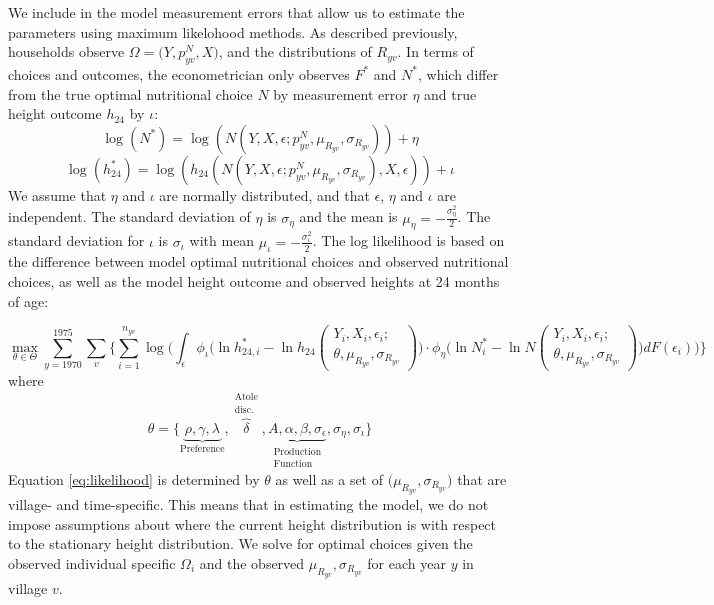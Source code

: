 \label{subsec:estitwo}

We include in the model  measurement errors that allow us to estimate the parameters using maximum likelohood methods.
As described previously, households observe $\Omega = \big(Y, p^{N}_{yv}, X\big)$, and the distributions of $R_{yv}$. In terms of choices and outcomes, the econometrician only observes $F^{*}$ and $N^{*}$, which differ from the true optimal nutritional choice $N$ by measurement error $\eta$ and true height outcome $h_{24}$ by $\iota$:
\begin{equation}
\log(N^{*}) = \log(N(Y, X, \epsilon; p^{N}_{yv},\mu_{R_{yv}},\sigma_{R_{yv}})) + \eta
\end{equation}
\begin{equation}
\log(h_{24}^{*}) = \log(h_{24}(N(Y, X, \epsilon; p^{N}_{yv},\mu_{R_{yv}},\sigma_{R_{yv}}), X, \epsilon)) + \iota
\end{equation}
We assume that $\eta$ and $\iota$ are normally distributed, and that $\epsilon$, $\eta$ and $\iota$ are independent. The standard deviation of $\eta$ is $\sigma_{\eta}$ and the mean is $\mu_{\eta}=-\frac{\sigma_{\eta}^2}{2}$. The standard deviation for $\iota$ is $\sigma_{\iota}$ with mean $\mu_{\iota}=-\frac{\sigma_{\iota}^2}{2}$. The log likelihood is based on the difference between model optimal nutritional choices and observed nutritional choices, as well as the model height outcome and observed heights at 24 months of age:

\begin{equation}
\label{eq:likelihood}
\max_{\theta\in\Theta} \sum_{y=1970}^{1975}\sum_{v} \bigg\{ \sum_{i=1}^{n_{yv}} \log \bigg( \int_{\epsilon} \phi_{\iota}
\big(
\ln h_{24,i}^{*}-
\ln h_{24}(
\substack{
Y_{i}, X_{i}, \epsilon_i; \\
\theta,\mu_{R_{yv}}, \sigma_{R_{yv}}
}
)
\big)
\cdot \phi_{\eta}\big(\ln N^{*}_{i} -
\ln N(
\substack{
Y_{i}, X_{i}, \epsilon_i; \\
\theta,\mu_{R_{yv}}, \sigma_{R_{yv}}
}
)
\big) dF(\epsilon_i) \bigg)\bigg\}
\end{equation}
where
\begin{equation}
\theta=\{\underbrace{\rho, \gamma, \lambda}_{\text{Preference}}, \overbrace{\delta}^{\substack{\text{Atole} \\ \text{disc.}}}, \underbrace{A, \alpha , \beta, \sigma_{\epsilon} }_{\substack{\text{Production} \\ \text{Function}}}, \sigma_{\eta},\sigma_{\iota}\}
\end{equation}
Equation \ref{eq:likelihood} is determined by $\theta$ as well as a set of $\big(\mu_{R_{yv}}, \sigma_{R_{yv}}\big)$ that are village- and time-specific. This means that in estimating the model, we do not impose assumptions about where the current height distribution is with respect to the stationary height distribution. We solve for optimal choices given the observed individual specific $\Omega_i$ and the observed $\mu_{R_{yv}}, \sigma_{R_{yv}}$ for each year $y$ in village $v$.

